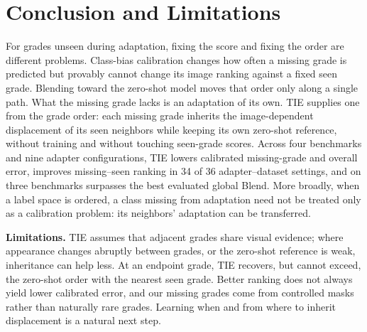 \section{Conclusion and Limitations}
\label{sec:conclusion}

For grades unseen during adaptation, fixing the score and fixing the order are different problems.
Class-bias calibration changes how often a missing grade is predicted but provably cannot change its image ranking against a fixed seen grade.
Blending toward the zero-shot model moves that order only along a single path.
What the missing grade lacks is an adaptation of its own.
TIE supplies one from the grade order: each missing grade inherits the image-dependent displacement of its seen neighbors while keeping its own zero-shot reference, without training and without touching seen-grade scores.
Across four benchmarks and nine adapter configurations, TIE lowers calibrated missing-grade and overall error, improves missing--seen ranking in 34 of 36 adapter--dataset settings, and on three benchmarks surpasses the best evaluated global Blend.
More broadly, when a label space is ordered, a class missing from adaptation need not be treated only as a calibration problem: its neighbors' adaptation can be transferred.

\noindent\textbf{Limitations.}
TIE assumes that adjacent grades share visual evidence; where appearance changes abruptly between grades, or the zero-shot reference is weak, inheritance can help less.
At an endpoint grade, TIE recovers, but cannot exceed, the zero-shot order with the nearest seen grade.
Better ranking does not always yield lower calibrated error, and our missing grades come from controlled masks rather than naturally rare grades.
Learning when and from where to inherit displacement is a natural next step.
